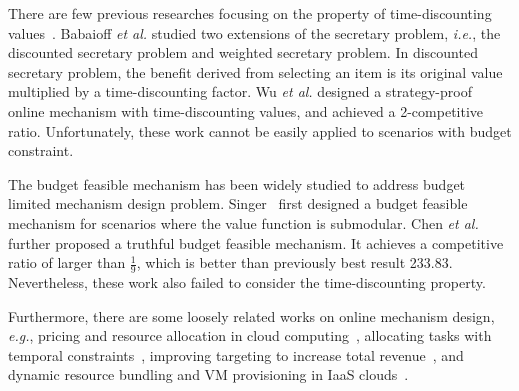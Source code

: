 \documentclass[conference,compsocconf,letterpaper,10pt]{IEEEtran}
\newcommand{\ie}{{\em i.e.}}
\newcommand{\eg}{{\em e.g.}}
\newcommand{\et}{{\em et al. }}
\begin{document}
There are few previous researches focusing on the property of time-discounting values~\cite{Frazier:2014:IE:2600057.2602897,Olariu:2014:AIA:2581555.2581569,Fujita:2014:ASA:2615731.2616036}. Babaioff \et\cite{babaioff2009secretary} studied two extensions of the secretary problem, \ie, the discounted secretary problem and weighted secretary problem. In discounted secretary problem, the benefit derived from selecting an item is its original value multiplied by a time-discounting factor. Wu \et\cite{wu2014strategy} designed a strategy-proof online mechanism with time-discounting values, and achieved a 2-competitive ratio. Unfortunately, these work cannot be easily applied to scenarios with budget constraint. 

The budget feasible mechanism has been widely studied to address budget limited mechanism design problem. Singer~\cite{singer2010budget} first designed a budget feasible mechanism for scenarios where the value function is submodular. Chen \et\cite{chen2011approximability} further proposed a truthful budget feasible mechanism. It achieves a competitive ratio of larger than $\frac{1}{9}$, which is better than previously best result 233.83. Nevertheless, these work also failed to consider the time-discounting property.

Furthermore, there are some loosely related works on online mechanism design, \eg,  pricing and resource allocation in cloud computing~\cite{Shi:2014:OAF:2591971.2591980}, allocating tasks with temporal constraints~\cite{nunes2015multi}, improving targeting to increase total revenue~\cite{Hummel:2015:ITI:2736277.2741079}, and dynamic resource bundling and VM provisioning in IaaS clouds~\cite{Zhang:2015:OAI:2796314.2745855}.
\end{document}
